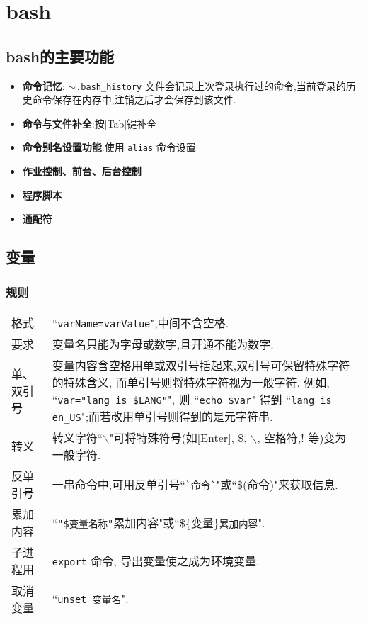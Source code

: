 \section{bash}

\subsection{bash的主要功能}
\begin{itemize}
    \item \textbf{命令记忆}: \texttt{$\sim$.bash\_history} 文件会记录上次登录执行过的命令,当前登录的历史命令保存在内存中,注销之后才会保存到该文件.

    \item \textbf{命令与文件补全}:按[Tab]键补全

    \item \textbf{命令别名设置功能}:使用 \texttt{alias} 命令设置

    \item \textbf{作业控制、前台、后台控制}

    \item \textbf{程序脚本}

    \item \textbf{通配符}
\end{itemize}

\subsection{变量}

\subsubsection{规则}
\begin{longtable}{lp{}}\hline\hline
格式 & ``\texttt{varName=varValue}",中间不含空格. \\

要求 &     变量名只能为字母或数字,且开通不能为数字.\\

单、双引号  &   变量内容含空格用单或双引号括起来,双引号可保留特殊字符的特殊含义,%
    而单引号则将特殊字符视为一般字符.
    例如, ``\texttt{var="lang is \$LANG"}", 则 ``\texttt{echo \$var}" 得到 ``\texttt{lang is en\_US}";而若改用单引号则得到的是元字符串.\\

转义  &     转义字符``$\backslash$"可将特殊符号(如[Enter], \$, $\backslash$, 空格符,! 等)变为一般字符.\\

反单引号 &     一串命令中,可用反单引号``\verb|`命令`|"或``\$(命令)"来获取信息.\\

累加内容 &     ``\texttt{"\$变量名称"}累加内容"或``\$\{变量\}\verb|累加内容|".\\

子进程用 & \texttt{export} 命令, 导出变量使之成为环境变量. \\

取消变量 & ``\texttt{unset 变量名}".\\
\hline
\end{longtable}

